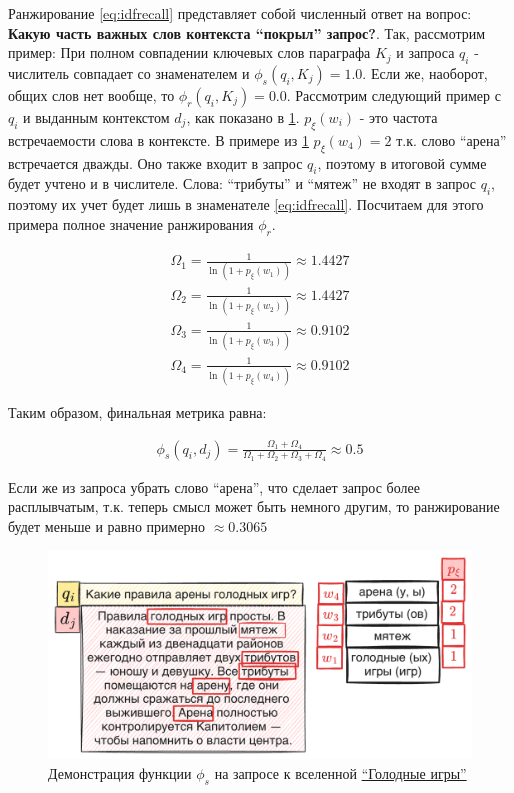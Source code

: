 Ранжирование \eqref{eq:idfrecall} представляет собой численный ответ на вопрос: \textbf{Какую часть важных слов контекста ``покрыл'' запрос?}. Так, рассмотрим пример:
При полном совпадении ключевых слов параграфа $K_j$ и запроса $q_i$ - числитель совпадает со знаменателем и $\phi_s(q_i, K_j)=1.0$. Если же, наоборот, 
общих слов нет вообще, то $\phi_r(q_i, K_j)=0.0$. Рассмотрим следующий пример с $q_i$ и выданным контекстом $d_j$, как показано в 
\ref{fig:sample-hunger-games}. $p_{\xi}(w_i)$ - это частота встречаемости слова в контексте. В 
примере из \ref{fig:sample-hunger-games} $p_{\xi}(w_4)=2$ т.к. слово ``арена'' встречается дважды. Оно также входит в запрос $q_i$, поэтому в итоговой сумме будет учтено и в числителе.
Слова: ``трибуты'' и ``мятеж'' не входят в запрос $q_i$, поэтому их учет будет лишь в знаменателе \eqref{eq:idfrecall}. Посчитаем для этого примера полное значение ранжирования $\phi_r$.
\begin{small}
    \begin{align}
        \Omega_1=\frac{1}{\ln(1 + p_{\xi}(w_1))}\approx 1.4427 \\
        \Omega_2=\frac{1}{\ln(1 + p_{\xi}(w_2))}\approx 1.4427 \\
        \Omega_3=\frac{1}{\ln(1 + p_{\xi}(w_3))}\approx 0.9102\\
        \Omega_4=\frac{1}{\ln(1 + p_{\xi}(w_4))}\approx 0.9102
    \end{align}
    \label{eq:calculation-for-sample}
\end{small}

Таким образом, финальная метрика равна:

\begin{small}
    \begin{align}
        \phi_s(q_i, d_j)=\frac{\Omega_1 + \Omega_4}{\Omega_1+\Omega_2+\Omega_3+\Omega_4}\approx 0.5
    \end{align}
\end{small}

Если же из запроса убрать слово ``арена'', что сделает запрос более расплывчатым, т.к. теперь смысл может быть немного другим, то ранжирование будет меньше и равно примерно $\approx 0.3065$

\begin{figure}[ht]
    \centering
    \includegraphics[width=\columnwidth]{figures/sample-hunger-games.png} %
    \caption{Демонстрация функции $\phi_s$ на запросе к вселенной  \href{https://w.wiki/DQ\$z}{``Голодные игры''}}
    \label{fig:sample-hunger-games}
\end{figure}



